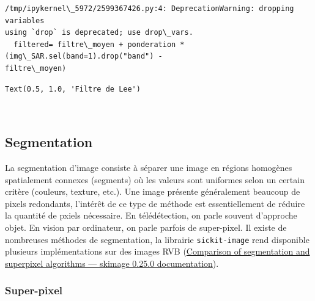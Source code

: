 \documentclass[11pt]{article}
\makeatletter
\newcommand{\boxspacing}{\kern\kvtcb@left@rule\kern\kvtcb@boxsep}
\newcommand{\prompt}[4]{
        {\ttfamily\llap{{\color{#2}[#3]:\hspace{3pt}#4}}\vspace{-\baselineskip}}
    }
\makeatother
\begin{document}
    \begin{Verbatim}[commandchars=\\\{\}]
/tmp/ipykernel\_5972/2599367426.py:4: DeprecationWarning: dropping variables
using `drop` is deprecated; use drop\_vars.
  filtered= filtre\_moyen + ponderation * (img\_SAR.sel(band=1).drop("band") -
filtre\_moyen)
    \end{Verbatim}

            \begin{tcolorbox}[breakable, size=fbox, boxrule=.5pt, pad at break*=1mm, opacityfill=0]
\prompt{Out}{outcolor}{18}{\boxspacing}
\begin{Verbatim}[commandchars=\\\{\}]
Text(0.5, 1.0, 'Filtre de Lee')
\end{Verbatim}
\end{tcolorbox}
        
    \begin{center}
    \end{center}
    { \hspace*{\fill} \\}
    
    \hypertarget{segmentation}{%
\subsection{Segmentation}\label{segmentation}}

La segmentation d'image consiste à séparer une image en régions
homogènes spatialement connexes (segments) où les valeurs sont uniformes
selon un certain critère (couleurs, texture, etc.). Une image présente
généralement beaucoup de pixels redondants, l'intérêt de ce type de
méthode est essentiellement de réduire la quantité de pxiels nécessaire.
En télédétection, on parle souvent d'approche objet. En vision par
ordinateur, on parle parfois de super-pixel. Il existe de nombreuses
méthodes de segmentation, la librairie \texttt{sickit-image} rend
disponible plusieurs implémentations sur des images RVB
(\href{https://scikit-image.org/docs/stable/auto_examples/segmentation/plot_segmentations.html\#sphx-glr-auto-examples-segmentation-plot-segmentations-py}{Comparison
of segmentation and superpixel algorithms --- skimage 0.25.0
documentation}).

\hypertarget{super-pixel}{%
\subsubsection{Super-pixel}\label{super-pixel}}
\end{document}
